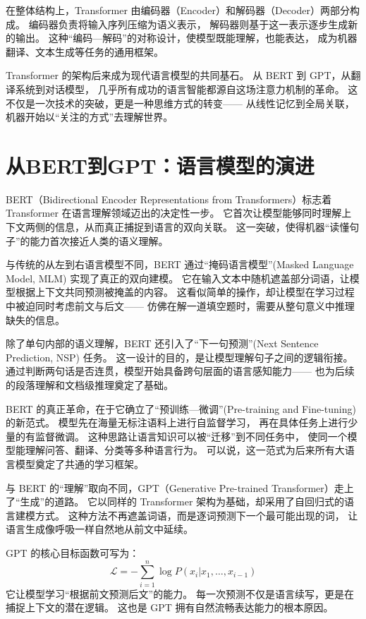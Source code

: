 在整体结构上，Transformer 由编码器（Encoder）和解码器（Decoder）两部分构成。  
编码器负责将输入序列压缩为语义表示，  
解码器则基于这一表示逐步生成新的输出。  
这种“编码—解码”的对称设计，使模型既能理解，也能表达，  
成为机器翻译、文本生成等任务的通用框架。  

Transformer 的架构后来成为现代语言模型的共同基石。  
从 BERT 到 GPT，从翻译系统到对话模型，  
几乎所有成功的语言智能都源自这场注意力机制的革命。  
这不仅是一次技术的突破，更是一种思维方式的转变——  
从线性记忆到全局关联，机器开始以“关注的方式”去理解世界。  

\section{从BERT到GPT：语言模型的演进}

BERT（Bidirectional Encoder Representations from Transformers）标志着 Transformer 在语言理解领域迈出的决定性一步。  
它首次让模型能够同时理解上下文两侧的信息，从而真正捕捉到语言的双向关联。  
这一突破，使得机器“读懂句子”的能力首次接近人类的语义理解。  

与传统的从左到右语言模型不同，BERT 通过“掩码语言模型”(Masked Language Model, MLM) 实现了真正的双向建模。  
它在输入文本中随机遮盖部分词语，让模型根据上下文共同预测被掩盖的内容。  
这看似简单的操作，却让模型在学习过程中被迫同时考虑前文与后文——  
仿佛在解一道填空题时，需要从整句意义中推理缺失的信息。  

除了单句内部的语义理解，BERT 还引入了“下一句预测”(Next Sentence Prediction, NSP) 任务。  
这一设计的目的，是让模型理解句子之间的逻辑衔接。  
通过判断两句话是否连贯，模型开始具备跨句层面的语言感知能力——  
也为后续的段落理解和文档级推理奠定了基础。  

BERT 的真正革命，在于它确立了“预训练—微调”(Pre-training and Fine-tuning) 的新范式。  
模型先在海量无标注语料上进行自监督学习，  
再在具体任务上进行少量的有监督微调。  
这种思路让语言知识可以被“迁移”到不同任务中，  
使同一个模型能理解问答、翻译、分类等多种语言行为。  
可以说，这一范式为后来所有大语言模型奠定了共通的学习框架。  

与 BERT 的“理解”取向不同，GPT（Generative Pre-trained Transformer）走上了“生成”的道路。  
它以同样的 Transformer 架构为基础，却采用了自回归式的语言建模方式。  
这种方法不再遮盖词语，而是逐词预测下一个最可能出现的词，  
让语言生成像呼吸一样自然地从前文中延续。  

GPT 的核心目标函数可写为：  
\[
\mathcal{L} = -\sum_{i=1}^n \log P(x_i | x_1, \ldots, x_{i-1})
\]  
它让模型学习“根据前文预测后文”的能力。  
每一次预测不仅是语言续写，更是在捕捉上下文的潜在逻辑。  
这也是 GPT 拥有自然流畅表达能力的根本原因。  

